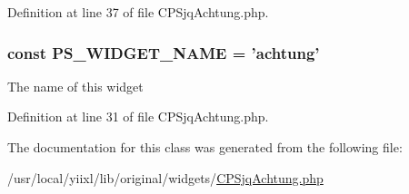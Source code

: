 Definition at line 37 of file CPSjqAchtung.php.

\hypertarget{classCPSjqAchtung_ae357f9dc377f7de0d12010b2ced28cbc}{
\subsubsection[{PS\_\-WIDGET\_\-NAME}]{\setlength{\rightskip}{0pt plus 5cm}const {\bf PS\_\-WIDGET\_\-NAME} = 'achtung'}}
\label{classCPSjqAchtung_ae357f9dc377f7de0d12010b2ced28cbc}
The name of this widget 

Definition at line 31 of file CPSjqAchtung.php.



The documentation for this class was generated from the following file:\begin{DoxyCompactItemize}
\item 
/usr/local/yiixl/lib/original/widgets/\hyperlink{CPSjqAchtung_8php}{CPSjqAchtung.php}\end{DoxyCompactItemize}
